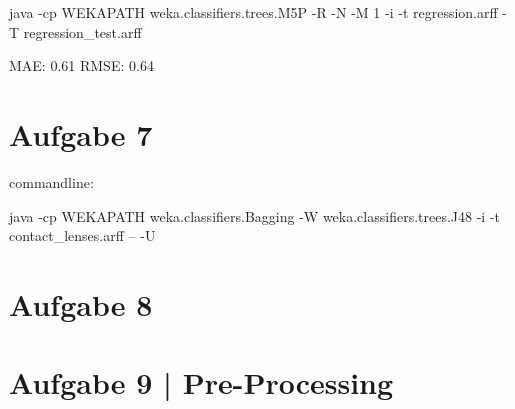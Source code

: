 java -cp WEKAPATH weka.classifiers.trees.M5P -R -N -M 1 -i -t regression.arff -T regression\_test.arff


MAE: 0.61 
RMSE: 0.64 


\section{Aufgabe 7}
commandline: 

java -cp WEKAPATH weka.classifiers.Bagging -W weka.classifiers.trees.J48 -i -t contact\_lenses.arff -- -U


\section{Aufgabe 8}


\section{Aufgabe 9 | Pre-Processing}



